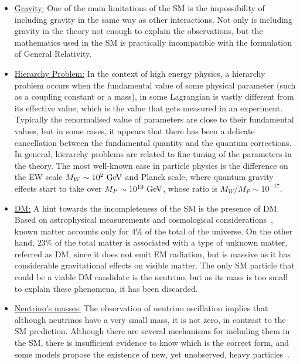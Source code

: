 \begin{itemize}
    \item \underline{Gravity:} One of the main limitations of the \ac{SM} is the impossibility of including gravity in the same way as other interactions. Not only is including gravity in the theory not enough to explain the observations, but the mathematics used in the \ac{SM} is practically incompatible with the formulation of General Relativity.
    \item \underline{Hierarchy Problem:} In the context of high energy physics, a hierarchy problem occurs when the fundamental value of some physical parameter (such as a coupling constant or a mass), in some Lagrangian is vastly different from its effective value, which is the value that gets measured in an experiment. Typically the renormalised value of parameters are close to their fundamental values, but in some cases, it appears that there has been a delicate cancellation between the fundamental quantity and the quantum corrections. In general, hierarchy problems are related to fine-tuning of the parameters in the theory. The most well-known case in particle physics is the difference on the \ac{EW} scale \(M_W \sim 10^2~\text{GeV}\) and Planck scale, where quantum gravity effects start to take over \(M_P\sim10^{19}~\text{GeV}\), whose ratio is \(M_W / M_P \sim 10^{-17}\).
    \item \underline{\acf{DM}:} A hint towards the incompleteness of the \ac{SM} is the presence of \ac{DM}. Based on astrophysical measurements and cosmological considerations~\cite{Zwicky-1937,Rubin_Kent-1970,Planck-2014,Clowe-2006,Brada-2008}, known matter accounts only for \(4\%\) of the total of the universe. On the other hand, \(23\%\) of the total matter is associated with a type of unknown matter, referred as \ac{DM}, since it does not emit \ac{EM} radiation, but is massive as it has considerable gravitational effects on visible matter. The only \ac{SM} particle that could be a viable \ac{DM} candidate is the neutrino, but as its mass is too small to explain these phenomena, it has been discarded.
    \item \underline{Neutrino's masses:} The observation of neutrino oscillation implies that although neutrinos have a very small mass, it is not zero, in contrast to the \ac{SM} prediction. Although there are several mechanisms for including them in the \ac{SM}, there is insufficient evidence to know which is the correct form, and some models propose the existence of new, yet unobserved, heavy particles~\cite{GellMann_Ramond_Slansky-2010,Glashow-1980,Ramond-2005}.
\end{itemize}





